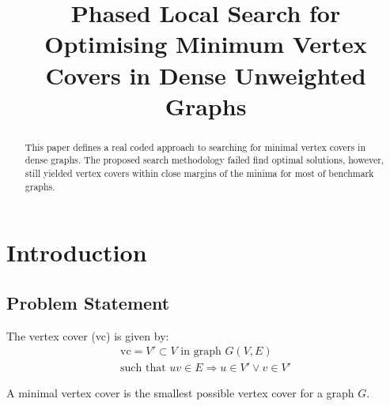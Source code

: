\documentclass[conference,letterpaper]{IEEEtran}
\begin{document}
\title{Phased Local Search for Optimising Minimum Vertex Covers in Dense Unweighted Graphs}
\author{
}

\maketitle

\begin{abstract}
    This paper defines a real coded approach to searching for minimal vertex covers in dense graphs. The proposed search methodology failed find optimal solutions, however, still yielded vertex covers within close margins of the minima for most of benchmark graphs.
\end{abstract}

%
%   
\section{Introduction}
\subsection{Problem Statement}
\par The vertex cover (vc) is given by:
\begin{equation}
    \begin{split}
        \mbox{vc} = V\prime \subset V \mbox{ in graph } G(V,E) \\
        \mbox{such that } uv \in E \Rightarrow u \in V\prime \lor v \in V\prime
    \end{split}
\end{equation}
\par A minimal vertex cover is the smallest possible vertex cover for a graph $G$.
\end{document}
